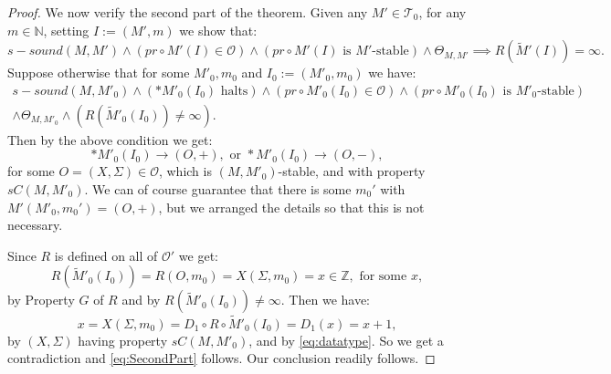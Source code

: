 \documentclass{amsart}  %
\numberwithin{equation}{section}
\theoremstyle{definition}
\theoremstyle{remark}
\DeclareMathOperator {\halt} {halt}
\begin{document}
{\begin{proof}
We now verify the second part of the theorem. 
Given any ${M}' \in \mathcal{T} _{0} $, for any $m \in \mathbb{N}$, setting $I:= (M',m)$ we show that: 
   \begin{equation} \label{eq:SecondPart}
   s-sound ({M},{M}') \land (pr \circ      M' (I) \in \mathcal{O})  \land ( pr \circ \text{$M' (I)$ is $M'$-stable} ) \land \Theta _{{M}, {M}'}   \implies R (\widetilde{M}'(I)) = \infty.  \end{equation}
Suppose otherwise that for some $M' _{0}, m _{0} $ and $I _{0}:= ({M}' _{0}, m _{0}) $ 
   we have: 
    \begin{multline*}   s-sound ({M}, {M}' _{0} ) \land (* M' _{0}  (I _{0}) \text{ halts}) \land  (pr \circ M' _{0} (I _{0} ) \in \mathcal{O}) \land ( pr \circ \text{$M' _{0}  (I _{0} )$ is $M' _{0} $-stable} )  \\ \land \Theta _{{M}, {M}' _{0}  } \land (R (\widetilde{M}' _{0}   (I _{0} )) \neq \infty).
    \end{multline*}
  Then by the above condition we get: 
   \begin{equation} \label{eq:datatype}
  *M' _{0}  (I _{0} ) \to (O,+), \text{ or } *M' _{0}  (I _{0} ) \to (O,-),
\end{equation}
   for some  $O = (X,\Sigma) \in \mathcal{O}$, which is $(M,M' _{0} )$-stable, and with property $sC ({M}, {M}' _{0} )$. We can of course guarantee that there is some $m _{0}'$ with $M' (M' _{0} , m _{0}' ) = (O,+)$, but we arranged the details so that this is not necessary. 

   Since $R$ is defined on all of $\mathcal{O}'$ we get: $$R (\widetilde{M}' _{0}   (I _{0} )) = R (O, m _{0}) =  X   (\Sigma, m _{0}  ) =x \in \mathbb{Z}, \text{ for some $x$},  $$ 
   by Property $G$ of $R$ and by $R (\widetilde{M}' _{0}  (I _{0} )) \neq \infty$.
Then we have: $$
    x=X (\Sigma, m _{0}) =   D_1 \circ R \circ \widetilde{M}' _{0}   (I _{0} )= D _{1} (x)= x+1,
   $$  
by $(X, \Sigma)$ having property $sC (M,M' _{0} )$, and by \eqref{eq:datatype}.
So we get a contradiction and \eqref{eq:SecondPart} follows.  Our conclusion readily follows.
\end{proof}

}
\end{document}
